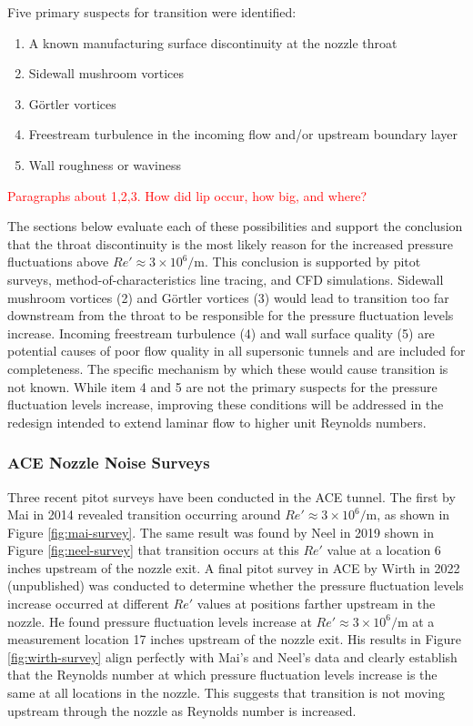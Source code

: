 Five primary suspects for transition were identified:

\begin{enumerate}
    \item A known manufacturing surface discontinuity at the nozzle throat
    \item Sidewall mushroom vortices
    \item Görtler vortices
    \item Freestream turbulence in the incoming flow and/or upstream boundary layer
    \item Wall roughness or waviness
\end{enumerate}

\textcolor{red}{Paragraphs about 1,2,3. How did lip occur, how big, and where?}

The sections below evaluate each of these possibilities and support the conclusion that the throat discontinuity is the most likely reason for the increased pressure fluctuations above $Re' \approx 3 \times 10^6/\mathrm{m}$. This conclusion is supported by pitot surveys, method-of-characteristics line tracing, and CFD simulations. Sidewall mushroom vortices (2) and Görtler vortices (3) would lead to transition too far downstream from the throat to be responsible for the pressure fluctuation levels increase. Incoming freestream turbulence (4) and wall surface quality (5) are potential causes of poor flow quality in all supersonic tunnels and are included for completeness. The specific mechanism by which these would cause transition is not known. While item 4 and 5 are not the primary suspects for the pressure fluctuation levels increase, improving these conditions will be addressed in the redesign intended to extend laminar flow to higher unit Reynolds numbers.

\subsubsection*{ACE Nozzle Noise Surveys}

Three recent pitot surveys have been conducted in the ACE tunnel. The first by Mai in 2014 \cite{mai-dis} revealed transition occurring around $Re' \approx 3 \times 10^6/\mathrm{m}$, as shown in Figure \ref{fig:mai-survey}. The same result was found by Neel in 2019 \cite{neel-dis} shown in Figure \ref{fig:neel-survey} that transition occurs at this $Re'$ value at a location 6 inches upstream of the nozzle exit. A final pitot survey in ACE by Wirth in 2022 (unpublished) was conducted to determine whether the pressure fluctuation levels increase occurred at different $Re'$ values at positions farther upstream in the nozzle. He found pressure fluctuation levels increase at $Re' \approx 3 \times 10^6/\mathrm{m}$ at a measurement location 17 inches upstream of the nozzle exit. His results in Figure \ref{fig:wirth-survey} align perfectly with Mai's and Neel's data and clearly establish that the Reynolds number at which pressure fluctuation levels increase is the same at all locations in the nozzle. This suggests that transition is not moving upstream through the nozzle as Reynolds number is increased.

